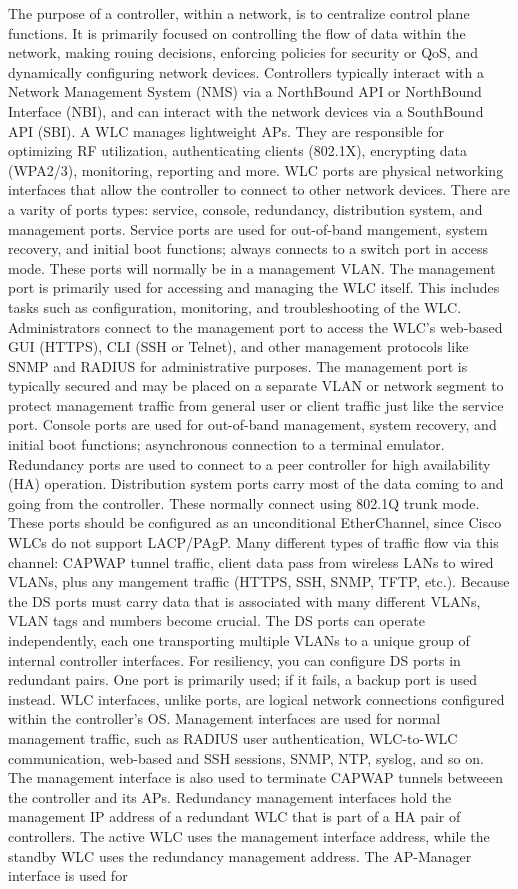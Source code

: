 \documentclass{article}
\begin{document}
	The purpose of a controller, within a network, is to centralize control plane functions. It is primarily focused on controlling the flow of data within the network, making rouing decisions, enforcing policies for security or QoS, and dynamically configuring network devices. Controllers typically interact with a Network Management System (NMS) via a NorthBound API or NorthBound Interface (NBI), and can interact with the network devices via a SouthBound API (SBI). A WLC manages lightweight APs. They are responsible for optimizing RF utilization, authenticating clients (802.1X), encrypting data (WPA2/3), monitoring, reporting and more. WLC ports are physical networking interfaces that allow the controller to connect to other network devices. There are a varity of ports types: service, console, redundancy, distribution system, and management ports. Service ports are used for out-of-band mangement, system recovery, and initial boot functions; always connects to a switch port in access mode. These ports will normally be in a management VLAN. The management port is primarily used for accessing and managing the WLC itself. This includes tasks such as configuration, monitoring, and troubleshooting of the WLC. Administrators connect to the management port to access the WLC's web-based GUI (HTTPS), CLI (SSH or Telnet), and other management protocols like SNMP and RADIUS for administrative purposes. The management port is typically secured and may be placed on a separate VLAN or network segment to protect management traffic from general user or client traffic just like the service port. Console ports are used for out-of-band management, system recovery, and initial boot functions; asynchronous connection to a terminal emulator. Redundancy ports are used to connect to a peer controller for high availability (HA) operation. Distribution system ports carry most of the data coming to and going from the controller. These normally connect using 802.1Q trunk mode. These ports should be configured as an unconditional EtherChannel, since Cisco WLCs do not support LACP/PAgP. Many different types of traffic flow via this channel: CAPWAP tunnel traffic, client data pass from wireless LANs to wired VLANs, plus any mangement traffic (HTTPS, SSH, SNMP, TFTP, etc.). Because the DS ports must carry data that is associated with many different VLANs, VLAN tags and numbers become crucial. The DS ports can operate independently, each one transporting multiple VLANs to a unique group of internal controller interfaces. For resiliency, you can configure DS ports in redundant pairs. One port is primarily used; if it fails, a backup port is used instead. WLC interfaces, unlike ports, are logical network connections configured within the controller's OS. Management interfaces are used for normal management traffic, such as RADIUS user authentication, WLC-to-WLC communication, web-based and SSH sessions, SNMP, NTP, syslog, and so on. The management interface is also used to terminate CAPWAP tunnels betweeen the controller and its APs. Redundancy management interfaces hold the management IP address of a redundant WLC that is part of a HA pair of controllers. The active WLC uses the management interface address, while the standby WLC uses the redundancy management address. The AP-Manager interface is used for 
\end{document}

